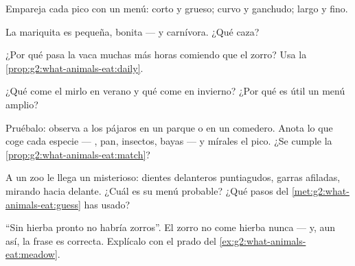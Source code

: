 \begin{exercise}[$\star$]\label{exo:g2:what-animals-eat:4}
Empareja cada pico con un menú: corto y grueso; curvo y ganchudo;
largo y fino.
\end{exercise}

\begin{exercise}[$\star$]\label{exo:g2:what-animals-eat:5}
La mariquita es pequeña, bonita --- y carnívora. ¿Qué caza?
\end{exercise}

\begin{exercise}[$\star$]\label{exo:g2:what-animals-eat:6}
¿Por qué pasa la vaca muchas más horas comiendo que el zorro? Usa la
\cref{prop:g2:what-animals-eat:daily}.
\end{exercise}

\begin{exercise}[$\star$]\label{exo:g2:what-animals-eat:7}
¿Qué come el mirlo en verano y qué come en invierno? ¿Por qué es útil
un menú amplio?
\end{exercise}

\begin{exercise}[$\star$]\label{exo:g2:what-animals-eat:8}
Pruébalo: observa a los pájaros en un parque o en un comedero. Anota
lo que coge cada especie --- , pan, insectos, bayas --- y
mírales el pico. ¿Se cumple la \cref{prop:g2:what-animals-eat:match}?
\end{exercise}

\begin{exercise}[$\star\star$]\label{exo:g2:what-animals-eat:9}
A un zoo le llega un  misterioso: dientes delanteros
puntiagudos, garras afiladas,  mirando hacia delante. ¿Cuál es su
menú probable? ¿Qué pasos del \cref{met:g2:what-animals-eat:guess} has
usado?
\end{exercise}

\begin{exercise}[$\star\star$]\label{exo:g2:what-animals-eat:10}
``Sin hierba pronto no habría zorros''. El zorro no come hierba nunca
--- y, aun así, la frase es correcta. Explícalo con el prado del
\cref{ex:g2:what-animals-eat:meadow}.
\end{exercise}
